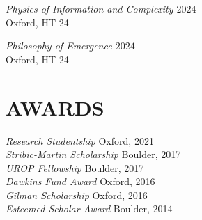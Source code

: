 \documentclass[margin]{res}
\begin{document}
\begin{resume}
                {\sl Physics of Information and Complexity \hfill $2024$}\\
                Oxford, HT 24

                {\sl Philosophy of Emergence \hfill $2024$}\\
                Oxford, HT 24

                \section{AWARDS}

                {\sl Research Studentship} \hfill Oxford, 2021 \\
                {\sl Stribic-Martin Scholarship} \hfill Boulder, 2017 \\
                        {\sl UROP Fellowship} \hfill Boulder, 2017 \\
                        {\sl Dawkins Fund Award} \hfill Oxford, 2016 \\
                        {\sl Gilman Scholarship} \hfill Oxford, 2016 \\
                        {\sl Esteemed Scholar Award} \hfill Boulder, 2014 \\




\end{resume}
\end{document}
